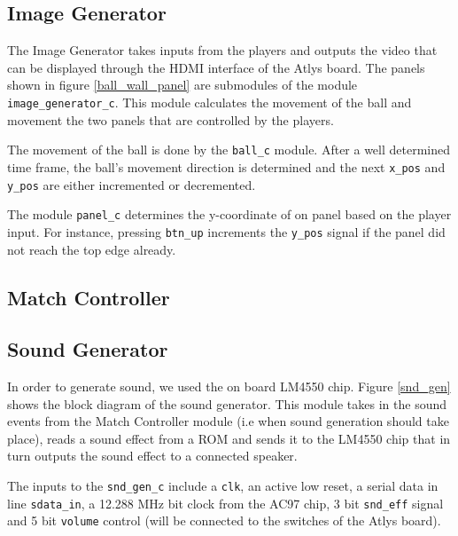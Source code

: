     \subsection{Image Generator}
    
        The Image Generator takes inputs from the players and outputs the video that can be displayed through the HDMI interface of the Atlys board. The panels shown in figure \ref{ball_wall_panel} are submodules of the module \texttt{image\_generator\_c}.
		This module calculates the movement of the ball and movement the two panels that are controlled by the players. 
		
		The movement of the ball is done by the \texttt{ball\_c} module.
		After a well determined time frame, the ball's movement direction is determined and the next \texttt{x\_pos} and \texttt{y\_pos} are either incremented or decremented. 
		
		The module \texttt{panel\_c} determines the y-coordinate of on panel based on the player input. For instance, pressing \texttt{btn\_up} increments the \texttt{y\_pos} signal if the panel did not reach the top edge already. 


    \subsection{Match Controller}
    
    \newpage
	  \subsection{Sound Generator}
				In order to generate sound, we used the on board LM4550 chip. Figure \ref{snd_gen} shows the block diagram of the sound generator. This module takes in the sound events from the Match Controller module (i.e when sound generation should take place), reads a sound effect from a ROM and sends it to the LM4550 chip that in turn outputs the sound effect to a connected speaker.
				
				The inputs to the \texttt{snd\_gen\_c} include a \texttt{clk}, an active low reset, a serial data in line \texttt{sdata\_in}, a 12.288 MHz bit clock from the AC97 chip, 3 bit \texttt{snd\_eff} signal and 5 bit \texttt{volume} control (will be connected to the switches of the Atlys board).
				

